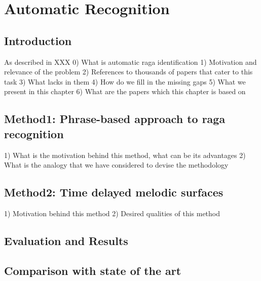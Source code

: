 
\chapter{Automatic \Raga Recognition}

\section{Introduction}


As described in XXX 
0) What is automatic raga identification
1) Motivation and relevance of the problem
2) References to thousands of papers that cater to this task
3) What lacks in them
4) How do we fill in the missing gaps
5) What we present in this chapter
6) What are the papers which this chapter is based on


\section{Method1: Phrase-based approach to raga recognition}

1) What is the motivation behind this method, what can be its advantages
2) What is the analogy that we have considered to devise the methodology


\section{Method2: Time delayed melodic surfaces}

1) Motivation behind this method
2) Desired qualities of this method

\section{Evaluation and Results}
\section{Comparison with state of the art}



